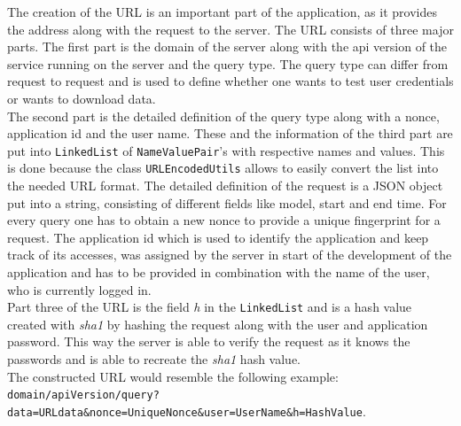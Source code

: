 The  creation of the URL is an important part of the application, as it provides the address along with the request to the server. The URL consists of three major parts. The first part is the domain of the server along with the api version of the service running on the server and the query type. The query type can differ from request to request and is used to define whether one wants to test user credentials or wants to download data.\\
The second part is the detailed definition of the query type along with a nonce, application id and the user name. These and the information of the third part are put into \lstinline$LinkedList$ of \lstinline$NameValuePair$'s with respective names and values. This is done because the class \lstinline$URLEncodedUtils$ allows to easily convert the list into the needed URL format. The detailed definition of the request is a JSON object put into a string, consisting of different fields like model, start and end time. For every query one has to obtain a new nonce to provide a unique fingerprint for a request. The application id which is used to identify the application and keep track of its accesses, was assigned by the server in start of the development of the application and has to be provided in combination with the name of the user, who is currently logged in.\\
Part three of the URL is the field \emph{h} in the \lstinline$LinkedList$ and is a hash value created with \emph{sha1} by hashing the request along with the user and application password. This way the server is able to verify the request as it knows the passwords and is able to recreate the \emph{sha1} hash value.\\
The constructed URL would resemble the following example: \nolinkurl{domain/apiVersion/query?data=URLdata&nonce=UniqueNonce&user=UserName&h=HashValue}.

